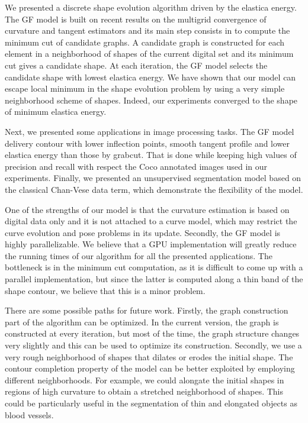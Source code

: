 \documentclass[smallextended]{svjour3}
\begin{document}
We presented a discrete shape evolution algorithm driven by the elastica energy. The GF model is built on recent results on the multigrid convergence of curvature and tangent estimators and its main step consists in to compute the minimum cut of candidate graphs. A candidate graph is constructed for each element in a neighborhood of shapes of the current digital set and its minimum cut gives a candidate shape. At each iteration, the GF model selects the candidate shape with lowest elastica energy. We have shown that our model can escape local minimum in the shape evolution problem by using a very simple neighborhood scheme of shapes. Indeed, our experiments converged to the shape of minimum elastica energy. 

Next, we presented some applications in image processing tasks. The GF model delivery contour with lower inflection points, smooth tangent profile and lower elastica energy than those by grabcut. That is done while keeping high values of precision and recall with respect the Coco annotated images used in our experiments. Finally, we presented an unsupervised segmentation model based on the classical Chan-Vese data term, which demonstrate the flexibility of the model. 

One of the strengths of our model is that the curvature estimation is based on digital data only and it is not attached to a curve model, which may restrict the curve evolution and pose problems in its update. Secondly, the GF model is highly parallelizable. We believe that a GPU implementation will greatly reduce the running times of our algorithm for all the presented applications. The bottleneck is in the minimum cut computation, as it is difficult to come up with a parallel implementation, but since the latter is computed along a thin band of the shape contour, we believe that this is a minor problem.

There are some possible paths for future work. Firstly, the graph construction part of the algorithm can be optimized. In the current version, the graph is constructed at every iteration, but most of the time, the graph structure changes very slightly and this can be used to optimize its construction. Secondly, we use a very rough neighborhood of shapes that dilates or erodes the initial shape. The contour completion property of the model can be better exploited by employing different neighborhoods. For example, we could alongate the initial shapes in regions of high curvature to obtain a stretched neighborhood of shapes. This could be particularly useful in the segmentation of thin and elongated objects as blood vessels.




\end{document}
